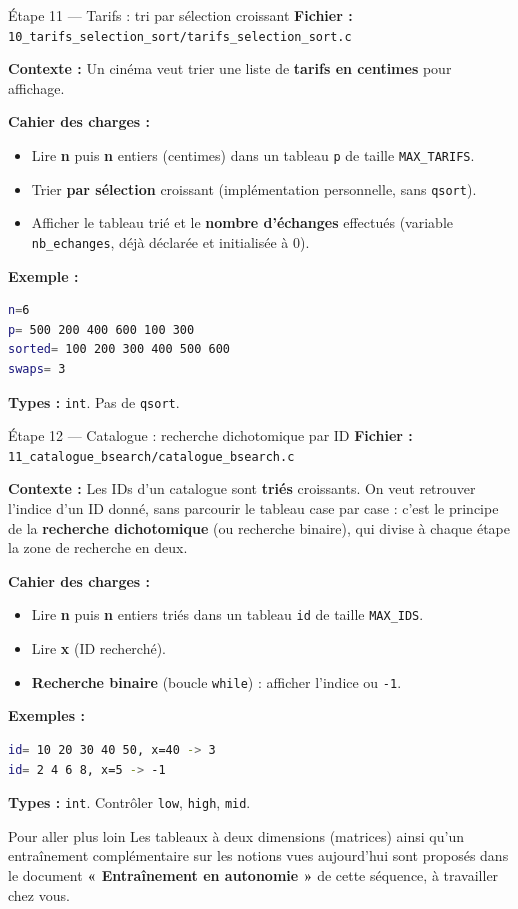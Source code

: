 \begin{UPSTIManipulation}{Étape 11 — Tarifs : tri par sélection croissant}
  \textbf{Fichier :} \texttt{10\_tarifs\_selection\_sort/tarifs\_selection\_sort.c}

  \textbf{Contexte :} Un cinéma veut trier une liste de \textbf{tarifs en centimes} pour affichage.

  \textbf{Cahier des charges :}
  \begin{itemize}
    \item Lire \textbf{n} puis \textbf{n} entiers (centimes) dans un tableau \texttt{p} de taille \texttt{MAX\_TARIFS}.
    \item Trier \textbf{par sélection} croissant (implémentation personnelle, sans \texttt{qsort}).
    \item Afficher le tableau trié et le \textbf{nombre d'échanges} effectués (variable \texttt{nb\_echanges}, déjà déclarée et initialisée à 0).
  \end{itemize}

  \textbf{Exemple :}
  \begin{lstlisting}[language=bash]
n=6
p= 500 200 400 600 100 300
sorted= 100 200 300 400 500 600
swaps= 3
  \end{lstlisting}

  \textbf{Types :} \texttt{int}. Pas de \texttt{qsort}.

\end{UPSTIManipulation}


\begin{UPSTIManipulation}{Étape 12 — Catalogue : recherche dichotomique par ID}
  \textbf{Fichier :} \texttt{11\_catalogue\_bsearch/catalogue\_bsearch.c}

  \textbf{Contexte :} Les IDs d'un catalogue sont \textbf{triés} croissants. On veut retrouver l'indice d'un ID donné, sans parcourir le tableau case par case : c'est le principe de la \textbf{recherche dichotomique} (ou recherche binaire), qui divise à chaque étape la zone de recherche en deux.

  \textbf{Cahier des charges :}
  \begin{itemize}
    \item Lire \textbf{n} puis \textbf{n} entiers triés dans un tableau \texttt{id} de taille \texttt{MAX\_IDS}.
    \item Lire \textbf{x} (ID recherché).
    \item \textbf{Recherche binaire} (boucle \texttt{while}) : afficher l'indice ou \texttt{-1}.
  \end{itemize}

  \textbf{Exemples :}
  \begin{lstlisting}[language=bash]
id= 10 20 30 40 50, x=40 -> 3
id= 2 4 6 8, x=5 -> -1
  \end{lstlisting}

  \textbf{Types :} \texttt{int}. Contrôler \texttt{low}, \texttt{high}, \texttt{mid}.

\end{UPSTIManipulation}

\begin{UPSTIinfor}{Pour aller plus loin}
  Les tableaux à deux dimensions (matrices) ainsi qu'un entraînement complémentaire sur les notions vues aujourd'hui sont proposés dans le document \textbf{« Entraînement en autonomie »} de cette séquence, à travailler chez vous.
\end{UPSTIinfor}
